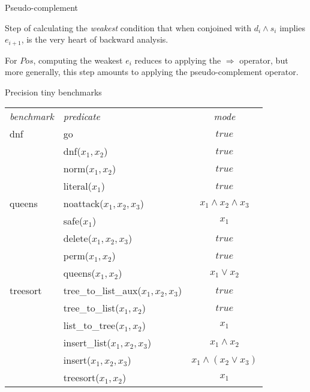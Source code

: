 \documentclass{beamer}
\def\lor{\vee}
\def\land{\wedge}
\begin{document}
\begin{frame}{Pseudo-complement}
\vspace{\fill}

Step of calculating the \textit{weakest} condition that when
conjoined with $d_i \wedge s_i$ implies $e_{i+1}$, is the very
heart of backward analysis.

For $Pos$, computing the weakest $e_i$ reduces to applying the
$\Rightarrow$ operator, but more generally, this step amounts to
applying the pseudo-complement operator.

\vspace{\fill}
\end{frame}



\begin{frame}{Precision tiny benchmarks}

{\small \begin{center}
\begin{tabular}{l|l|c}
\textit{benchmark} & \textit{predicate} & \textit{mode} \\

\cline{1-3}
dnf   & go & $true$ \\
    & dnf($x_1,x_2$) & $true$ \\
    & norm($x_1,x_2$) & $true$ \\
    & literal($x_1$) & $true$ \\

\cline{1-3}
queens   & noattack($x_1,x_2,x_3$) & $x_1 \land x_2 \land x_3$ \\
      & safe($x_1$) & $x_1$ \\
      & delete($x_1,x_2,x_3$) & $true$ \\
      & perm($x_1,x_2$) & $true$ \\
      & queens($x_1,x_2$) & $x_1\lor x_2$ \\

\cline{1-3}
treesort  & tree\_to\_list\_aux($x_1,x_2,x_3$) & $true$ \\
      & tree\_to\_list($x_1,x_2$) & $true$ \\
      & list\_to\_tree($x_1,x_2$) & $x_1$ \\
      & insert\_list($x_1,x_2,x_3$) & $x_1 \land x_2$ \\
      & insert($x_1,x_2,x_3$) & $x_1 \land (x_2\lor x_3)$ \\
      & treesort($x_1,x_2$) & $x_1$
\end{tabular}
\end{center}}

\end{frame}
\end{document}

